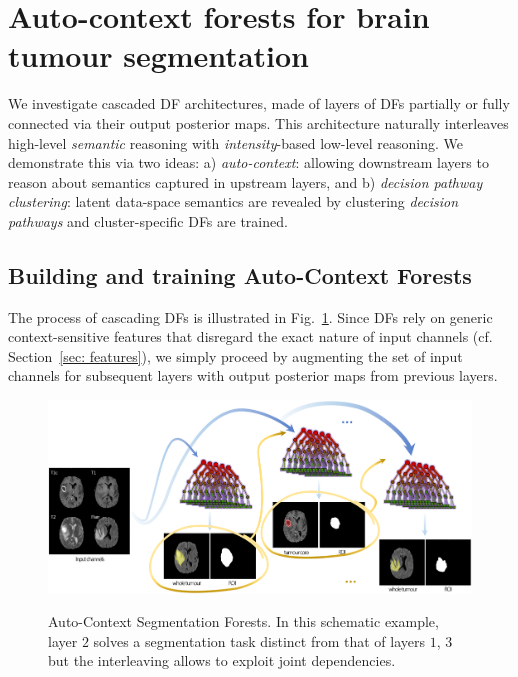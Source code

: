 
\section{Auto-context forests for brain tumour segmentation}
\label{sec: cascading}

We investigate cascaded DF architectures, made of layers of DFs partially or fully connected via their output posterior maps. 
This architecture naturally interleaves high-level \textit{semantic} reasoning with \textit{intensity}-based low-level 
reasoning. We demonstrate this via two ideas: a) \textit{auto-context}: allowing downstream layers to reason about 
semantics captured in upstream layers, and b) \textit{decision pathway clustering}: latent data-space semantics are 
revealed by clustering \textit{decision pathways} and cluster-specific DFs are trained. 

\subsection{Building and training Auto-Context Forests}

The process of cascading DFs is illustrated in Fig.~\ref{fig: DN concept}. Since DFs rely on generic context-sensitive features %
that disregard the exact nature of input channels (cf. Section~\ref{sec: features}), we simply proceed by augmenting the set of input channels for subsequent layers with output posterior maps from previous layers. %

\begin{figure}
\centering
\includegraphics[width=1\columnwidth]{images/DecisionNetwork-BRATS.png}
\label{fig: DN concept}
\caption{Auto-Context Segmentation Forests. In this schematic example, layer $2$ solves a segmentation task distinct from that of layers $1$, $3$ but the interleaving allows to exploit joint dependencies.}
\end{figure}

